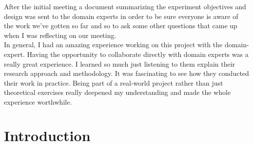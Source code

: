 \documentclass[
  10pt,
  letterpaper,
  twocolumn]{article}
\begin{document}
After the initial meeting a document summarizing the experiment
objectives and design was sent to the domain experts in order to be sure
everyone is aware of the work we've gotten so far and so to ask some
other questions that came up when I was reflecting on our meeting.\\
In general, I had an amazing experience working on this project with the
domain-expert. Having the opportunity to collaborate directly with
domain experts was a really great experience. I learned so much just
listening to them explain their research approach and methodology. It
was fascinating to see how they conducted their work in practice. Being
part of a real-world project rather than just theoretical exercises
really deepened my understanding and made the whole experience
worthwhile.

\hypertarget{introduction}{%
\section{Introduction}\label{introduction}}
\end{document}
